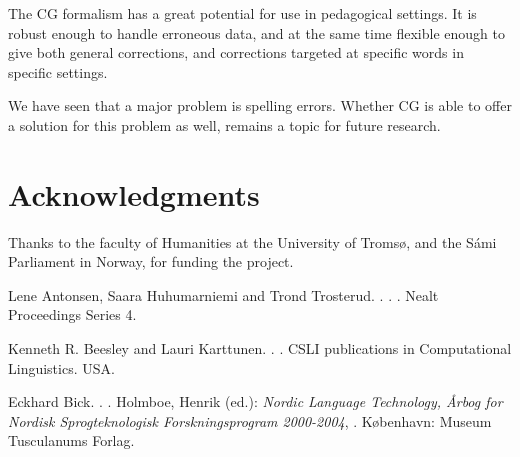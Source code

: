 \documentclass[11pt]{article}
\begin{document}
The CG formalism has a great potential for use in pedagogical settings.
It is robust enough to handle erroneous data, and at the same time flexible enough to give both general corrections, and corrections targeted at specific words in specific settings.

We have seen that a major problem is spelling errors. Whether CG is able to offer a solution for this problem as well, remains a topic for future research.

\section*{Acknowledgments}
Thanks to the faculty of Humanities at the University of Tromsø, and the Sámi Parliament in Norway, for funding the project. 

\begin{thebibliography}{}

{Lene Antonsen, Saara Huhumarniemi and Trond Trosterud}.
.
.
.
\newblock Nealt Proceedings Series 4.

{Kenneth R. Beesley and Lauri Karttunen}.
.
.
\newblock CSLI publications in Computational Linguistics.
\newblock USA.


{Eckhard Bick}.
.
.
\newblock Holmboe, Henrik (ed.): {\em Nordic Language Technology, Årbog for Nordisk Sprogteknologisk Forskningsprogram 2000-2004},
.
\newblock København: Museum Tusculanums Forlag.


\end{thebibliography}
\end{document}
